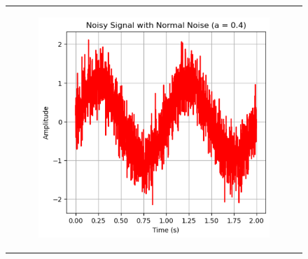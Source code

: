 \documentclass[hidelinks,12pt]{article}
\begin{document}
\begin{figure}[!h]
\begin{tabular}{c}
\begin{subfigure}[h]{0.3\textwidth}
			\end{subfigure}
			\hfill
			\begin{subfigure}[h]{0.3\textwidth}
				\centering
				\includegraphics[width=\textwidth]{figures/normal_noise/0.4.png}
			\end{subfigure} \\
			

\end{tabular}
\end{figure}
\end{document}
